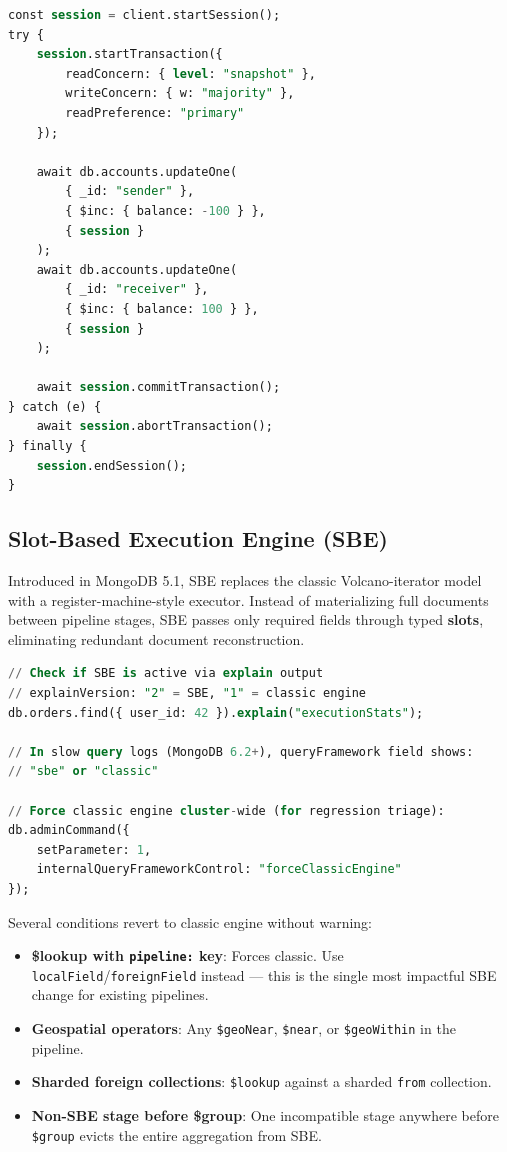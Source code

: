 \documentclass[12pt,a4paper]{article}
\begin{document}
\begin{lstlisting}[language=SQL, caption={Multi-document transactions (4.0+)}]
const session = client.startSession();
try {
    session.startTransaction({
        readConcern: { level: "snapshot" },
        writeConcern: { w: "majority" },
        readPreference: "primary"
    });

    await db.accounts.updateOne(
        { _id: "sender" },
        { $inc: { balance: -100 } },
        { session }
    );
    await db.accounts.updateOne(
        { _id: "receiver" },
        { $inc: { balance: 100 } },
        { session }
    );

    await session.commitTransaction();
} catch (e) {
    await session.abortTransaction();
} finally {
    session.endSession();
}
\end{lstlisting}

\subsection{Slot-Based Execution Engine (SBE)}

Introduced in MongoDB 5.1, SBE replaces the classic Volcano-iterator model with a register-machine-style executor. Instead of materializing full documents between pipeline stages, SBE passes only required fields through typed \textbf{slots}, eliminating redundant document reconstruction.

\begin{lstlisting}[language=SQL, caption={Detecting and controlling SBE}]
// Check if SBE is active via explain output
// explainVersion: "2" = SBE, "1" = classic engine
db.orders.find({ user_id: 42 }).explain("executionStats");

// In slow query logs (MongoDB 6.2+), queryFramework field shows:
// "sbe" or "classic"

// Force classic engine cluster-wide (for regression triage):
db.adminCommand({
    setParameter: 1,
    internalQueryFrameworkControl: "forceClassicEngine"
});
\end{lstlisting}

\begin{warnbox}
Several conditions revert to classic engine without warning:
\begin{itemize}
    \item \textbf{\$lookup with \texttt{pipeline:} key}: Forces classic. Use \texttt{localField}/\texttt{foreignField} instead --- this is the single most impactful SBE change for existing pipelines.
    \item \textbf{Geospatial operators}: Any \texttt{\$geoNear}, \texttt{\$near}, or \texttt{\$geoWithin} in the pipeline.
    \item \textbf{Sharded foreign collections}: \texttt{\$lookup} against a sharded \texttt{from} collection.
    \item \textbf{Non-SBE stage before \$group}: One incompatible stage anywhere before \texttt{\$group} evicts the entire aggregation from SBE.
\end{itemize}
\end{warnbox}
\end{document}
